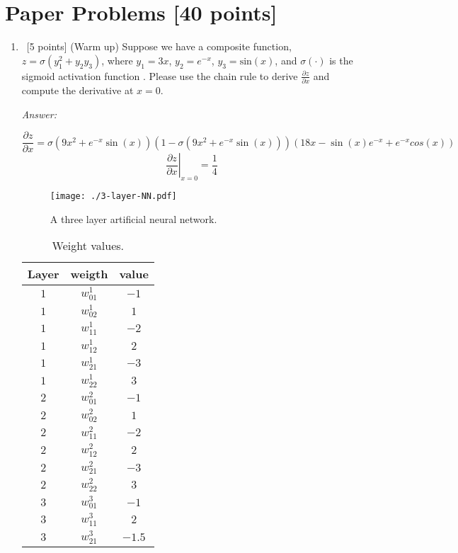 \documentclass[12pt, fullpage,letterpaper]{article}
\begin{document}
\section{Paper Problems [40 points]}
\begin{enumerate}
	\item~[5 points] (Warm up) Suppose we have a composite function, $z = \sigma(y_1^2 +y_2y_3) $, where  $y_1 = 3x$, $y_2 = e^{-x}$, $y_3 = \mathrm{sin}(x)$, and $\sigma(\cdot)$ is the sigmoid activation function . Please use the chain rule to derive $\frac{\partial z}{\partial x}$ and  compute the derivative at $x=0$.

	\textit{Answer:}

	\(\)
	\[
		\frac{\partial z}{\partial x} = \sigma(9x^2 + e^{-x} \sin(x)) (1 - \sigma(9x^2 + e^{-x} \sin(x))) (18x - \sin(x) e^{-x} + e^{-x} cos(x))
	\]
	\[
		\left. \frac{\partial z}{\partial x} \right|_{x=0} = \frac{1}{4}
	\]



	\begin{figure*}
		\centering
		\texttt{[image: ./3-layer-NN.pdf]}
		\caption{\small A three layer artificial neural network.} 
		\label{fig:3nn}
	\end{figure*}
	
	\begin{table}[h]
		\centering
		\begin{tabular}{c|cc}
			Layer & weigth  & value\\ 
			\hline\hline
			$1$ & $w_{01}^1$ & $-1$ \\ \hline
			$1$ & $w_{02}^1$ & $1$ \\ \hline
			$1$ & $w_{11}^1$ & $-2$ \\ \hline
			$1$ & $w_{12}^1$ & $2$ \\ \hline
			$1$ & $w_{21}^1$ & $-3$ \\ \hline
			$1$ & $w_{22}^1$ & $3$ \\ \hline
			$2$ & $w_{01}^2$ & $-1$ \\ \hline
			$2$ & $w_{02}^2$ & $1$ \\ \hline
			$2$ & $w_{11}^2$ & $-2$ \\ \hline
			$2$ & $w_{12}^2$ & $2$ \\ \hline
			$2$ & $w_{21}^2$ & $-3$ \\ \hline
			$2$ & $w_{22}^2$ & $3$ \\ \hline
			$3$ & $w_{01}^3$ & $-1$ \\ \hline
			$3$ & $w_{11}^3$ & $2$ \\ \hline
			$3$ & $w_{21}^3$ & $-1.5$ \\ \hline
		\end{tabular}
		\caption{Weight values.}
		\label{tb:w}
	\end{table}
	

\end{enumerate}
\end{document}
